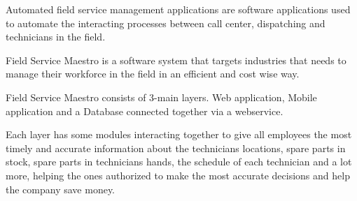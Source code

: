 Automated field service management applications are software applications used to automate the interacting processes between call center, dispatching and technicians in the field.
			
Field Service Maestro is a software system that targets industries that needs to manage their workforce in the field in an efficient and cost wise way.
			
Field Service Maestro consists of 3-main layers. Web application, Mobile application and a Database connected together via a webservice.
			
Each layer has some modules interacting together to give all employees the most timely and accurate information about the technicians locations, spare parts in stock, spare parts in technicians hands, the schedule of each technician and a lot more, helping the ones authorized to make the most accurate decisions and help the company save money.
